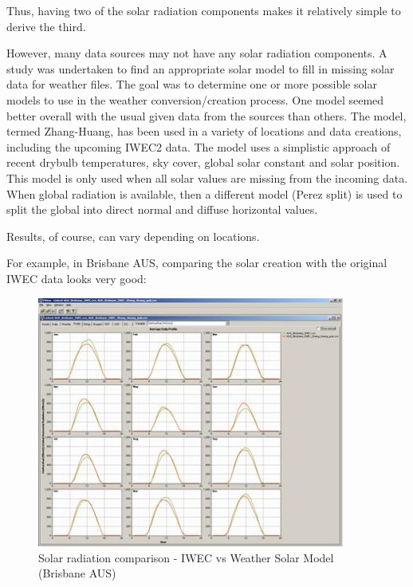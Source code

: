 Thus, having two of the solar radiation components makes it relatively simple to derive the third.

However, many data sources may not have any solar radiation components. A study was undertaken to find an appropriate solar model to fill in missing solar data for weather files. The goal was to determine one or more possible solar models to use in the weather conversion/creation process. One model seemed better overall with the usual given data from the sources than others. The model, termed Zhang-Huang, has been used in a variety of locations and data creations, including the upcoming IWEC2 data. The model uses a simplistic approach of recent drybulb temperatures, sky cover, global solar constant and solar position. This model is only used when all solar values are missing from the incoming data. When global radiation is available, then a different model (Perez split) is used to split the global into direct normal and diffuse horizontal values.

Results, of course, can vary depending on locations.

For example, in Brisbane AUS, comparing the solar creation with the original IWEC data looks very good:

\begin{figure}[hbtp] %
\centering
\includegraphics[width=0.9\textwidth, height=0.9\textheight, keepaspectratio=true]{media/image006.jpg}
\caption{Solar radiation comparison - IWEC vs Weather Solar Model (Brisbane AUS) \protect \label{fig:solar-radiation-comparison-iwec-vs-weather}}
\end{figure}

